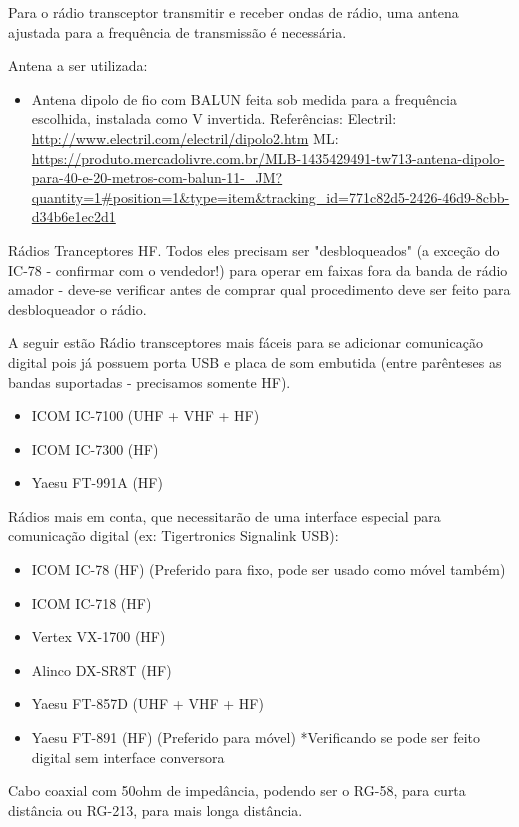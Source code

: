 \documentclass[11pt,a4paper]{article}
\begin{document}
Para o rádio transceptor transmitir e receber ondas de rádio, uma antena ajustada para a frequência de transmissão é necessária.

Antena a ser utilizada:
\begin{itemize}
\item Antena dipolo de fio com BALUN feita sob medida para a frequência escolhida, instalada como V invertida. Referências: Electril:     \url{http://www.electril.com/electril/dipolo2.htm} ML: \url{https://produto.mercadolivre.com.br/MLB-1435429491-tw713-antena-dipolo-para-40-e-20-metros-com-balun-11-_JM?quantity=1#position=1&type=item&tracking_id=771c82d5-2426-46d9-8cbb-d34b6e1ec2d1}
\end{itemize}

Rádios Tranceptores HF. Todos eles precisam ser "desbloqueados" (a exceção do IC-78 - confirmar com o vendedor!) para operar em faixas fora da banda de rádio amador - deve-se verificar antes de comprar qual procedimento deve ser feito para desbloqueador o rádio. 

A seguir estão Rádio transceptores mais fáceis para se adicionar comunicação digital pois já possuem porta USB e placa de som embutida (entre parênteses as bandas suportadas - precisamos somente HF).

\begin{itemize}
\item ICOM IC-7100 (UHF + VHF + HF)
\item ICOM IC-7300 (HF)
\item Yaesu FT-991A (HF)
\end{itemize}

Rádios mais em conta, que necessitarão de uma interface especial para comunicação digital (ex: Tigertronics Signalink USB):
\begin{itemize}
\item ICOM IC-78 (HF) (Preferido para fixo, pode ser usado como móvel também)
\item ICOM IC-718 (HF)
\item Vertex VX-1700 (HF)
\item Alinco DX-SR8T (HF)
\item Yaesu FT-857D (UHF + VHF + HF)
\item Yaesu FT-891 (HF) (Preferido para móvel)  *Verificando se pode ser feito digital sem interface conversora
\end{itemize}

Cabo coaxial com 50ohm de impedância, podendo ser o RG-58, para curta distância ou RG-213, para mais longa distância.
\end{document}
